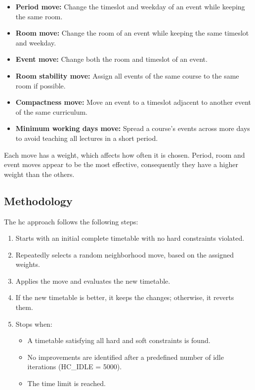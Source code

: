 \begin{itemize}
\item \textbf{Period move:} Change the timeslot and weekday of an event while keeping the same room.
\item \textbf{Room move:} Change the room of an event while keeping the same timeslot and weekday.
\item \textbf{Event move:} Change both the room and timeslot of an event.
\item \textbf{Room stability move:} Assign all events of the same course to the same room if possible.
\item \textbf{Compactness move:} Move an event to a timeslot adjacent to another event of the same curriculum.
\item \textbf{Minimum working days move:} Spread a course's events across more days to avoid teaching all lectures in a short period.
\end{itemize}

Each move has a weight, which affects how often it is chosen. Period, room and event moves appear to be the most effective, consequently they have a higher weight than the others.

\subsection{Methodology}

The \ac{hc} approach follows the following steps:

\begin{enumerate}
\item Starts with an initial complete timetable with no hard constraints violated.
\item Repeatedly selects a random neighborhood move, based on the assigned weights.
\item Applies the move and evaluates the new timetable.
\item If the new timetable is better, it keeps the changes; otherwise, it reverts them.
\item Stops when:
	\begin{itemize}
	\item A timetable satisfying all hard and soft constraints is found.
	\item No improvements are identified after a predefined number of idle iterations (HC\_IDLE = 5000).
	\item The time limit is reached.
	\end{itemize}
\end{enumerate}

